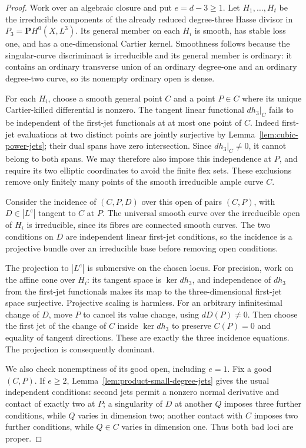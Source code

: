 \begin{proof}
Work over an algebraic closure and put $e=d-3\ge1$.
Let $H_1,\ldots,H_t$ be the irreducible components of the
already reduced degree-three Hasse divisor in
$P_3=\mathbf P H^0(X,L^3)$.
Its general member on each $H_i$ is smooth, has stable loss one,
and has a one-dimensional Cartier kernel. Smoothness follows
because the singular-curve discriminant is irreducible and its
general member is ordinary: it contains an ordinary transverse
union of an ordinary degree-one and an ordinary degree-two
curve, so its nonempty ordinary open is dense.

For each $H_i$, choose a smooth general point $C$ and a point
$P\in C$ where its unique Cartier-killed differential is nonzero.
The tangent linear functional $dh_3|_C$ fails to be independent
of the first-jet functionals at at most one point of $C$.
Indeed first-jet evaluations at two distinct points are jointly
surjective by Lemma~\ref{lem:cubic-power-jets}; their dual spans
have zero intersection. Since $dh_3|_C\ne0$, it cannot belong
to both spans. We may therefore also impose this independence
at $P$, and require its two elliptic coordinates to avoid the
finite flex sets. These exclusions remove only finitely many
points of the smooth irreducible ample curve $C$.

Consider the incidence of $(C,P,D)$ over this open of pairs
$(C,P)$, with $D\in|L^e|$ tangent to $C$ at $P$.
The universal smooth curve over the irreducible open of $H_i$
is irreducible, since its fibres are connected smooth curves.
The two conditions on $D$ are independent linear first-jet
conditions, so the incidence is a projective bundle over an
irreducible base before removing open conditions.

The projection to $|L^e|$ is submersive on the chosen locus.
For precision, work on the affine cone over $H_i$: its tangent
space is $\ker dh_3$, and independence of $dh_3$ from the
first-jet functionals makes its map to the three-dimensional
first-jet space surjective. Projective scaling is harmless.
For an arbitrary infinitesimal change of $D$, move $P$ to
cancel its value change, using $dD(P)\ne0$. Then choose the
first jet of the change of $C$ inside $\ker dh_3$ to preserve
$C(P)=0$ and equality of tangent directions. These are exactly
the three incidence equations. The projection is consequently
dominant.

We also check nonemptiness of its good open, including $e=1$.
Fix a good $(C,P)$. If $e\ge2$,
Lemma~\ref{lem:product-small-degree-jets} gives the
usual independent conditions: second jets permit a nonzero
normal derivative and contact of exactly two at $P$;
a singularity of $D$ at another $Q$ imposes three further
conditions, while $Q$ varies in dimension two; another contact
with $C$ imposes two further conditions, while $Q\in C$ varies
in dimension one. Thus both bad loci are proper.


\end{proof}
